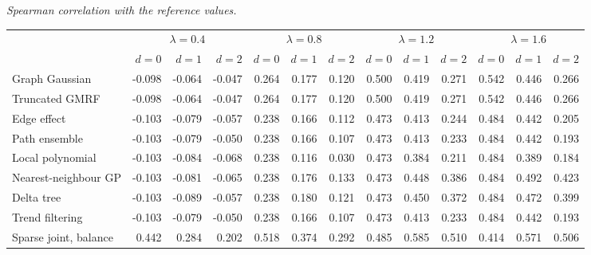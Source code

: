 \documentclass[11pt]{article}
\begin{document}
\noindent\textit{Spearman correlation with the reference values.}
\begin{center}
\footnotesize
\setlength{\tabcolsep}{3pt}
\begin{tabular}{l*{12}{r}}
\toprule
 & \multicolumn{3}{c}{$\lambda=0.4$} & \multicolumn{3}{c}{$\lambda=0.8$} & \multicolumn{3}{c}{$\lambda=1.2$} & \multicolumn{3}{c}{$\lambda=1.6$} \\
\cmidrule(lr){2-4}\cmidrule(lr){5-7}\cmidrule(lr){8-10}\cmidrule(lr){11-13}
 & $d=0$ & $d=1$ & $d=2$ & $d=0$ & $d=1$ & $d=2$ & $d=0$ & $d=1$ & $d=2$ & $d=0$ & $d=1$ & $d=2$ \\
\midrule
Graph Gaussian & -0.098 & -0.064 & -0.047 & 0.264 & 0.177 & 0.120 & 0.500 & 0.419 & 0.271 & 0.542 & 0.446 & 0.266 \\
Truncated GMRF & -0.098 & -0.064 & -0.047 & 0.264 & 0.177 & 0.120 & 0.500 & 0.419 & 0.271 & 0.542 & 0.446 & 0.266 \\
Edge effect & -0.103 & -0.079 & -0.057 & 0.238 & 0.166 & 0.112 & 0.473 & 0.413 & 0.244 & 0.484 & 0.442 & 0.205 \\
Path ensemble & -0.103 & -0.079 & -0.050 & 0.238 & 0.166 & 0.107 & 0.473 & 0.413 & 0.233 & 0.484 & 0.442 & 0.193 \\
Local polynomial & -0.103 & -0.084 & -0.068 & 0.238 & 0.116 & 0.030 & 0.473 & 0.384 & 0.211 & 0.484 & 0.389 & 0.184 \\
Nearest-neighbour GP & -0.103 & -0.081 & -0.065 & 0.238 & 0.176 & 0.133 & 0.473 & 0.448 & 0.386 & 0.484 & 0.492 & 0.423 \\
Delta tree & -0.103 & -0.089 & -0.057 & 0.238 & 0.180 & 0.121 & 0.473 & 0.450 & 0.372 & 0.484 & 0.472 & 0.399 \\
Trend filtering & -0.103 & -0.079 & -0.050 & 0.238 & 0.166 & 0.107 & 0.473 & 0.413 & 0.233 & 0.484 & 0.442 & 0.193 \\
Sparse joint, balance & 0.442 & 0.284 & 0.202 & 0.518 & 0.374 & 0.292 & 0.485 & 0.585 & 0.510 & 0.414 & 0.571 & 0.506 \\
\bottomrule
\end{tabular}
\end{center}
\end{document}
